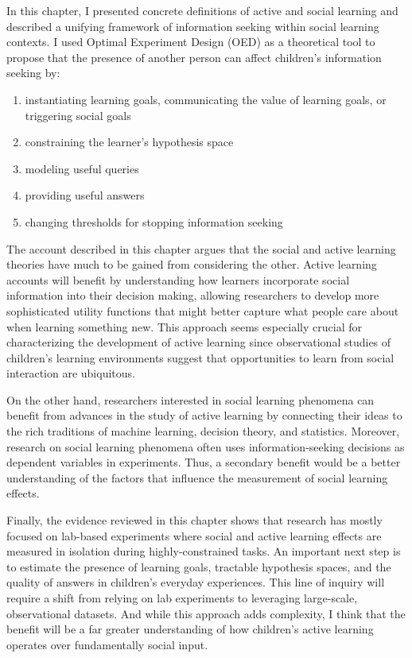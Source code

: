 \documentclass[oneside]{report}
\begin{document}
In this chapter, I presented concrete definitions of active and social
learning and described a unifying framework of information seeking
within social learning contexts. I used Optimal Experiment Design (OED)
as a theoretical tool to propose that the presence of another person can
affect children's information seeking by:
\begin{enumerate}
\def\labelenumi{\arabic{enumi}.}
\tightlist
\item
  instantiating learning goals, communicating the value of learning
  goals, or triggering social goals
\item
  constraining the learner's hypothesis space
\item
  modeling useful queries
\item
  providing useful answers
\item
  changing thresholds for stopping information seeking
\end{enumerate}
\noindent
The account described in this chapter argues that the social and active
learning theories have much to be gained from considering the other.
Active learning accounts will benefit by understanding how learners
incorporate social information into their decision making, allowing
researchers to develop more sophisticated utility functions that might
better capture what people care about when learning something new. This
approach seems especially crucial for characterizing the development of
active learning since observational studies of children's learning
environments suggest that opportunities to learn from social interaction
are ubiquitous.

On the other hand, researchers interested in social learning phenomena
can benefit from advances in the study of active learning by connecting
their ideas to the rich traditions of machine learning, decision theory,
and statistics. Moreover, research on social learning phenomena often
uses information-seeking decisions as dependent variables in
experiments. Thus, a secondary benefit would be a better understanding
of the factors that influence the measurement of social learning
effects.

Finally, the evidence reviewed in this chapter shows that research has
mostly focused on lab-based experiments where social and active learning
effects are measured in isolation during highly-constrained tasks. An
important next step is to estimate the presence of learning goals,
tractable hypothesis spaces, and the quality of answers in children's
everyday experiences. This line of inquiry will require a shift from
relying on lab experiments to leveraging large-scale, observational
datasets. And while this approach adds complexity, I think that the
benefit will be a far greater understanding of how children's active
learning operates over fundamentally social input.
\end{document}
